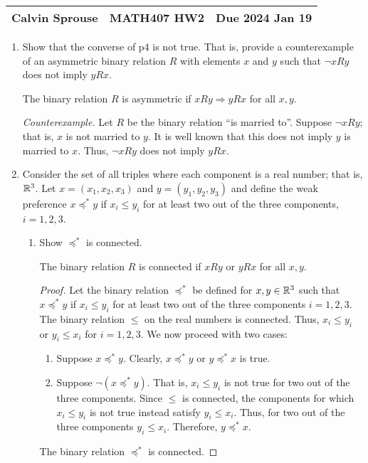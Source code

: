 \documentclass[a4paper, 12pt]{config/homework}
\begin{document}
\noindent
\begin{tabularx}{\textwidth}{>{\centering\arraybackslash}X>{\centering\arraybackslash}X>{\centering\arraybackslash}X}
Calvin Sprouse & MATH407 HW2 & Due 2024 Jan 19\\
\midrule
\end{tabularx}

\begin{enumerate}
\item Show that the converse of p4 is not true. That is, provide a counterexample of an asymmetric binary relation \(R\) with elements \(x\) and \(y\) such that \(\neg xRy\) does not imply \(yRx\).

The binary relation \(R\) is asymmetric if \(xRy \Rightarrow yRx\) for all \(x,y\).

\textit{Counterexample.} Let \(R\) be the binary relation ``is married to''. Suppose \(\neg xRy\); that is, \(x\) is not married to \(y\). It is well known that this does not imply \(y\) is married to \(x\). Thus, \(\neg xRy\) does not imply \(yRx\).

\item Consider the set of all triples where each component is a real number; that is, \(\mathbb{R}^3\). Let \(x=(x_1,x_2,x_3)\) and \(y=(y_1,y_2,y_3)\) and define the weak preference \(x \preccurlyeq^* y\) if \(x_i \le y_i\) for at least two out of the three components, \(i=1,2,3\).
\begin{enumerate}[label= (\alph*)]
\item Show \(\preccurlyeq^*\) is connected.

The binary relation \(R\) is connected if \(xRy\) or \(yRx\) for all \(x,y\).
\begin{proof}
Let the binary relation \(\preccurlyeq^*\) be defined for \(x,y\in \mathbb{R}^3\) such that \(x \preccurlyeq^* y\) if \(x_i \le y_i\) for at least two out of the three components \(i = 1, 2, 3\). The binary relation \(\le \) on the real numbers is connected. Thus, \(x_i \le y_i\) or \(y_i \le x_i\) for \(i= 1, 2, 3\). We now proceed with two cases:
\begin{enumerate}[label= \roman*.]
\item Suppose \(x \preccurlyeq^* y\). Clearly, \(x \preccurlyeq^* y\) or \(y \preccurlyeq^* x\) is true.
\item Suppose \(\neg (x \preccurlyeq^* y)\). That is, \(x_i \le y_i\) is not true for two out of the three components. Since \(\le \) is connected, the components for which \(x_i \le y_i\) is not true instead satisfy \(y_i \le x_i\). Thus, for two out of the three components \(y_i \le x_i\). Therefore, \(y \preccurlyeq^* x\).
\end{enumerate}
The binary relation \(\preccurlyeq^*\) is connected.
\end{proof}


\end{enumerate}
\end{enumerate}
\end{document}
